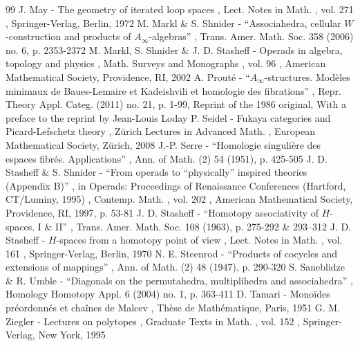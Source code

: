 \documentclass[11pt]{article}
\numberwithin{equation}{section}\providecommand{\No}{}
\begin{document}
\begin{thebibliography}{99}
 J. May - The geometry of iterated loop spaces , Lect. Notes in Math. , vol. 271 , Springer-Verlag, Berlin, 1972
 M. Markl \& S. Shnider - “Associahedra, cellular $W$-construction and products of $A_\infty $-algebras” , Trans. Amer. Math. Soc. 358 (2006) no. 6, p. 2353-2372
 M. Markl, S. Shnider \& J. D. Stasheff - Operads in algebra, topology and physics , Math. Surveys and Monographs , vol. 96 , American Mathematical Society, Providence, RI, 2002
 A. Prouté - “$A_\infty $-structures. Modèles minimaux de Baues-Lemaire et Kadeishvili et homologie des fibrations” , Repr. Theory Appl. Categ. (2011) no. 21, p. 1-99, Reprint of the 1986 original, With a preface to the reprint by Jean-Louis Loday
 P. Seidel - Fukaya categories and Picard-Lefschetz theory , Zürich Lectures in Advanced Math. , European Mathematical Society, Zürich, 2008
 J.-P. Serre - “Homologie singulière des espaces fibrés. Applications” , Ann. of Math. (2) 54 (1951), p. 425-505
 J. D. Stasheff \& S. Shnider - “From operads to “physically” inspired theories (Appendix B)” , in Operads: Proceedings of Renaissance Conferences (Hartford, CT/Luminy, 1995) , Contemp. Math. , vol. 202 , American Mathematical Society, Providence, RI, 1997, p. 53-81
 J. D. Stasheff - “Homotopy associativity of $H$-spaces. I \& II” , Trans. Amer. Math. Soc. 108 (1963), p. 275-292 \& 293–312
 J. D. Stasheff - $H$-spaces from a homotopy point of view , Lect. Notes in Math. , vol. 161 , Springer-Verlag, Berlin, 1970
 N. E. Steenrod - “Products of cocycles and extensions of mappings” , Ann. of Math. (2) 48 (1947), p. 290-320
 S. Saneblidze \& R. Umble - “Diagonals on the permutahedra, multiplihedra and associahedra” , Homology Homotopy Appl. 6 (2004) no. 1, p. 363-411
 D. Tamari - Monoïdes préordonnés et chaînes de Malcev , Thèse de Mathématique, Paris, 1951
 G. M. Ziegler - Lectures on polytopes , Graduate Texts in Math. , vol. 152 , Springer-Verlag, New York, 1995
\end{thebibliography}
\end{document}
